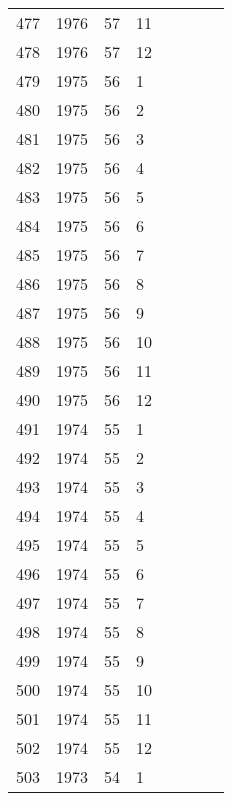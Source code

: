 \begin{longtable}{ |l|l|l|l|l|l|l|l| }
477 & 1976 & 57 &    11 &         &                &  & \\
478 & 1976 & 57 &    12 &         &                &   & \\
479 & 1975 & 56 &     1 &         &                &  & \\
480 & 1975 & 56 &     2 &         &                &  & \\
481 & 1975 & 56 &     3 &         &                &  & \\
482 & 1975 & 56 &     4 &         &                &  & \\
483 & 1975 & 56 &     5 &         &                &  & \\
484 & 1975 & 56 &     6 &         &                &  & \\
485 & 1975 & 56 &     7 &         &                &  & \\
486 & 1975 & 56 &     8 &         &                &  & \\
487 & 1975 & 56 &     9 &         &                &  & \\
488 & 1975 & 56 &    10 &         &                &  & \\
489 & 1975 & 56 &    11 &         &                &  & \\
490 & 1975 & 56 &    12 &         &                &  & \\
491 & 1974 & 55 &     1 &         &                &  & \\
492 & 1974 & 55 &     2 &         &                &  & \\
493 & 1974 & 55 &     3 &         &                &  & \\
494 & 1974 & 55 &     4 &         &                &  & \\
495 & 1974 & 55 &     5 &         &                &  & \\
496 & 1974 & 55 &     6 &         &                &  & \\
497 & 1974 & 55 &     7 &         &                &  & \\
498 & 1974 & 55 &     8 &         &                &  & \\
499 & 1974 & 55 &     9 &         &                &  & \\
500 & 1974 & 55 &    10 &         &                &  & \\
501 & 1974 & 55 &    11 &         &                &  & \\
502 & 1974 & 55 &    12 &         &                &  & \\
503 & 1973 & 54 &     1 &         &                &  & \\

\end{longtable}
